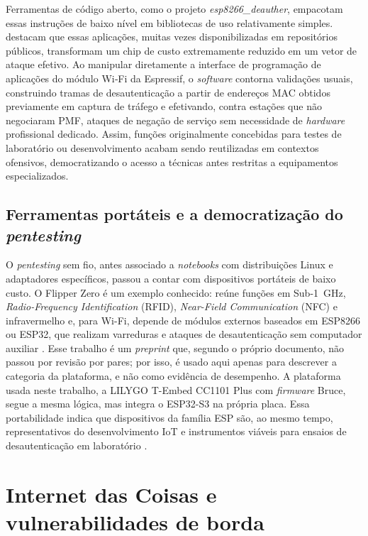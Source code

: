 Ferramentas de código aberto, como o projeto \textit{esp8266\_deauther}, empacotam essas instruções de baixo nível em bibliotecas de uso relativamente simples.  destacam que essas aplicações, muitas vezes disponibilizadas em repositórios públicos, transformam um chip de custo extremamente reduzido em um vetor de ataque efetivo. Ao manipular diretamente a interface de programação de aplicações do módulo Wi‑Fi da Espressif, o \textit{software} contorna validações usuais, construindo tramas de desautenticação a partir de endereços MAC obtidos previamente em captura de tráfego e efetivando, contra estações que não negociaram PMF, ataques de negação de serviço sem necessidade de \textit{hardware} profissional dedicado. Assim, funções originalmente concebidas para testes de laboratório ou desenvolvimento acabam sendo reutilizadas em contextos ofensivos, democratizando o acesso a técnicas antes restritas a equipamentos especializados.

\subsection{Ferramentas portáteis e a democratização do \textit{pentesting}}

O \textit{pentesting} sem fio, antes associado a \textit{notebooks} com distribuições Linux e adaptadores específicos, passou a contar com dispositivos portáteis de baixo custo. O Flipper Zero é um exemplo conhecido: reúne funções em Sub-1~GHz, \textit{Radio-Frequency Identification} (RFID), \textit{Near-Field Communication} (NFC) e infravermelho e, para Wi-Fi, depende de módulos externos baseados em ESP8266 ou ESP32, que realizam varreduras e ataques de desautenticação sem computador auxiliar \cite{James2023}. Esse trabalho é um \textit{preprint} que, segundo o próprio documento, não passou por revisão por pares; por isso, é usado aqui apenas para descrever a categoria da plataforma, e não como evidência de desempenho. A plataforma usada neste trabalho, a LILYGO T-Embed CC1101 Plus com \textit{firmware} Bruce, segue a mesma lógica, mas integra o ESP32-S3 na própria placa. Essa portabilidade indica que dispositivos da família ESP são, ao mesmo tempo, representativos do desenvolvimento IoT e instrumentos viáveis para ensaios de desautenticação em laboratório \cite{LitayemAlsadi2023}.

\section{Internet das Coisas e vulnerabilidades de borda}

